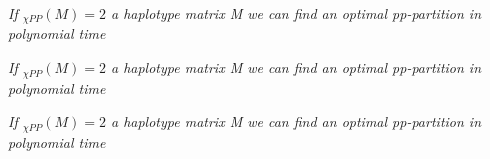 \documentclass{beamer}
\begin{document}
\begin{frame}

	\begin{important}[information]
  \textit{If $_{\chi PP}(M)=2$ a haplotype matrix M we can find an optimal pp-partition in polynomial time}
	\end{important}  

	\begin{information}[formula]
  \textit{If $_{\chi PP}(M)=2$ a haplotype matrix M we can find an optimal pp-partition in polynomial time}
	\end{information}
  
 	\begin{information}[net]
  \textit{If $_{\chi PP}(M)=2$ a haplotype matrix M we can find an optimal pp-partition in polynomial time}
 	\end{information}
\end{frame}
\end{document}
